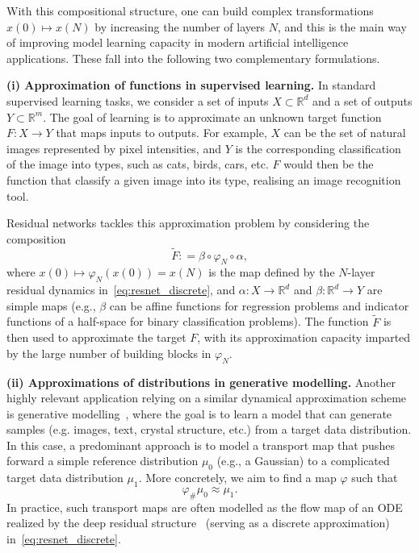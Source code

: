 \documentclass[12pt]{amsart}
\numberwithin{equation}{section}
\theoremstyle{remark}
\begin{document}
With this compositional structure, one can build complex transformations $x(0)\mapsto x(N)$
by increasing the number of layers $N$,
and this is the main way of improving model learning capacity in modern artificial intelligence applications.
These fall into the following two complementary formulations.

\noindent \textbf{(i) Approximation of functions in supervised learning.}
In standard supervised learning tasks, we consider a set of
inputs $X \subset \mathbb R^d$ and a set of outputs $Y \subset \mathbb R^m$.
The goal of learning is to approximate an unknown target function $F:X\to Y$ that maps inputs to outputs.
For example, $X$ can be the set of natural images represented by pixel intensities, and
$Y$ is the corresponding classification of the image into types, such as cats, birds, cars, etc.
$F$ would then be the function that classify a given image into its type,
realising an image recognition tool.

Residual networks tackles this approximation problem by considering the composition
\begin{equation}
    \tilde F : = \beta\circ \varphi_N\circ \alpha,
\end{equation}
where $x(0) \mapsto \varphi_N(x(0)) = x(N)$ is the map defined by the $N$-layer residual dynamics in~\eqref{eq:resnet_discrete},
and $\alpha:X\to \mathbb R^d$ and $\beta:\mathbb R^d\to Y$ are simple maps (e.g., $\beta$ can be affine functions for regression problems and indicator functions
of a half-space for binary classification problems).
The function $\tilde F$ is then used to approximate the target $F$,
with its approximation capacity imparted by the large number of building blocks in $\varphi_N$.

\smallskip
\noindent\textbf{(ii) Approximations of distributions in generative modelling.}
Another highly relevant application relying on a similar dynamical approximation scheme is generative
modelling~\cite{rezende2015variational,ho2020denoising,song2019generative},
where the goal is to learn a model that can generate samples (e.g. images, text, crystal structure, etc.)
from a target data distribution. 
In this case, a predominant approach is to model a transport map that pushes forward a simple reference distribution
$\mu_0$ (e.g., a Gaussian) to a complicated target data distribution $\mu_1$.
More concretely, we aim to find a map $\varphi$ such that
\begin{equation}
    \varphi_{\#}\mu_0 \approx \mu_1.
\end{equation}
In practice, such transport maps are often modelled as the flow map of an ODE realized by the
deep residual structure~\cite{ho2020denoising,song2019generative,song2020score,rezende2015variational} (serving as a discrete approximation) in~\eqref{eq:resnet_discrete}.
\end{document}
